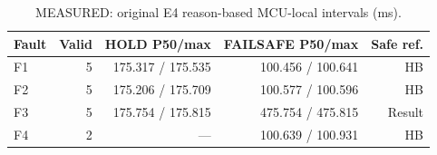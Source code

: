\begin{table}[H]
\centering\small
\caption{MEASURED: original E4 reason-based MCU-local intervals (ms).}\label{tab:e4}
\begin{tabular}{lrrrr}
\toprule
Fault & Valid & HOLD P50/max & FAILSAFE P50/max & Safe ref. \\
\midrule
F1 & 5 & 175.317 / 175.535 & 100.456 / 100.641 & HB \\
F2 & 5 & 175.206 / 175.709 & 100.577 / 100.596 & HB \\
F3 & 5 & 175.754 / 175.815 & 475.754 / 475.815 & Result \\
F4 & 2 & --- & 100.639 / 100.931 & HB \\
\bottomrule
\end{tabular}
\end{table}
